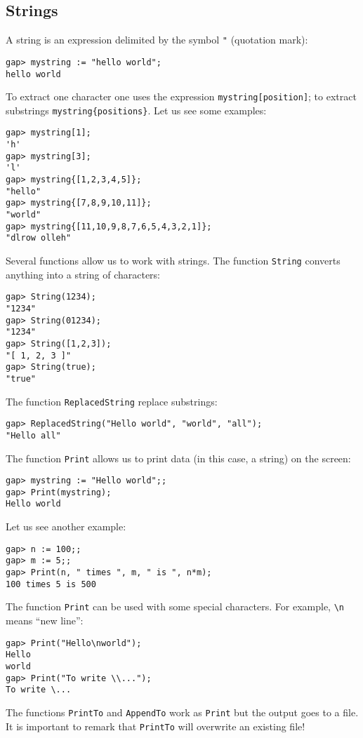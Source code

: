 \subsection{Strings}

A string is an expression delimited by the symbol 
\lstinline{"} (quotation mark): 
\begin{lstlisting}
gap> mystring := "hello world";
hello world
\end{lstlisting}
To extract one character one uses the expression \lstinline{mystring[position]};
to extract substrings \lstinline|mystring{positions}|. Let us see
some examples:
\begin{lstlisting}
gap> mystring[1];
'h'
gap> mystring[3];
'l'
gap> mystring{[1,2,3,4,5]};
"hello"
gap> mystring{[7,8,9,10,11]};
"world"
gap> mystring{[11,10,9,8,7,6,5,4,3,2,1]};
"dlrow olleh"
\end{lstlisting}

Several functions allow us to work with strings. The function 
\lstinline{String} converts anything into a string of characters:
\begin{lstlisting}
gap> String(1234);
"1234"
gap> String(01234);
"1234"
gap> String([1,2,3]);
"[ 1, 2, 3 ]"
gap> String(true);
"true"
\end{lstlisting}

The function \lstinline{ReplacedString} replace substrings: 
\begin{lstlisting}
gap> ReplacedString("Hello world", "world", "all");
"Hello all"
\end{lstlisting}

The function \lstinline{Print} allows us to 
print data (in this case, a string) 
on the screen:
\begin{lstlisting}
gap> mystring := "Hello world";;
gap> Print(mystring);
Hello world
\end{lstlisting}
Let us see another example:
\begin{lstlisting}
gap> n := 100;;                                                       
gap> m := 5;;
gap> Print(n, " times ", m, " is ", n*m);
100 times 5 is 500
\end{lstlisting}
The function \lstinline{Print} can be used with some special characters. For example, 
\lstinline{\n} means ``new line'':
\begin{lstlisting}
gap> Print("Hello\nworld");
Hello
world
gap> Print("To write \\...");
To write \... 
\end{lstlisting}
The functions \lstinline{PrintTo} and \lstinline{AppendTo} work as \lstinline{Print} but the output goes
to a file. It is important to remark that \lstinline{PrintTo} will overwrite an existing file!

